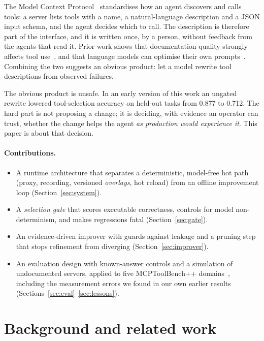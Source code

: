 \documentclass[11pt]{article}
\begin{document}
The Model Context Protocol~\cite{mcp2024} standardises how an agent discovers and calls tools: a server lists tools with a name,
a natural-language description and a JSON input schema, and the agent decides which to call. The description is therefore part of
the interface, and it is written once, by a person, without feedback from the agents that read it. Prior work shows that
documentation quality strongly affects tool use~\cite{hsieh2023tooldoc,yuan2024easytool}, and that language models can optimise
their own prompts~\cite{zhou2022ape,yang2023opro,khattab2023dspy}. Combining the two suggests an obvious product: let a model
rewrite tool descriptions from observed failures.

The obvious product is unsafe. In an early version of this work an ungated rewrite lowered tool-selection accuracy on held-out
tasks from 0.877 to 0.712. The hard part is not proposing a change; it is deciding, with evidence an operator can trust, whether
the change helps the agent \emph{as production would experience it}. This paper is about that decision.

\paragraph{Contributions.}
\begin{itemize}
  \item A runtime architecture that separates a deterministic, model-free hot path (proxy, recording, versioned
        \emph{overlays}, hot reload) from an offline improvement loop (Section~\ref{sec:system}).
  \item A \emph{selection gate} that scores executable correctness, controls for model non-determinism, and makes regressions
        fatal (Section~\ref{sec:gate}).
  \item An evidence-driven improver with guards against leakage and a pruning step that stops refinement from diverging
        (Section~\ref{sec:improver}).
  \item An evaluation design with known-answer controls and a simulation of undocumented servers, applied to five
        MCPToolBench++ domains~\cite{mcptoolbenchpp}, including the measurement errors we found in our own earlier results
        (Sections~\ref{sec:eval}--\ref{sec:lessons}).
\end{itemize}

\section{Background and related work}
\end{document}
